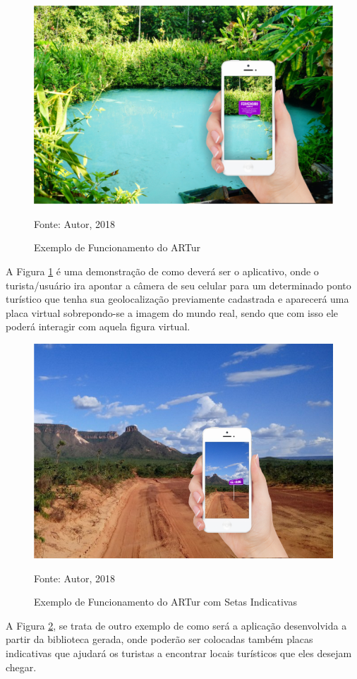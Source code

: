 \begin{figure}[H]
	\centering
	\includegraphics[scale=1.1]{imagens/fervedouro}
	\caption{Exemplo de Funcionamento do ARTur}
	Fonte: Autor, 2018
	\label{fig:artur}
\end{figure}

A Figura \ref{fig:artur} é uma demonstração de como deverá ser o aplicativo, onde o turista/usuário ira apontar a câmera de seu celular para um determinado ponto turístico que tenha sua geolocalização previamente cadastrada e aparecerá uma placa virtual sobrepondo-se a imagem do mundo real, sendo que com isso ele poderá interagir com aquela figura virtual.

\begin{figure}[H]
	\centering
	\includegraphics[scale=1.5]{imagens/estrada}
	\caption{Exemplo de Funcionamento do ARTur com Setas Indicativas}
	Fonte: Autor, 2018
	\label{fig:artur2}
\end{figure}

A Figura \ref{fig:artur2}, se trata de outro exemplo de como será a aplicação desenvolvida a partir da biblioteca gerada, onde poderão ser colocadas também placas indicativas que ajudará os turistas a encontrar locais turísticos que eles desejam chegar.

